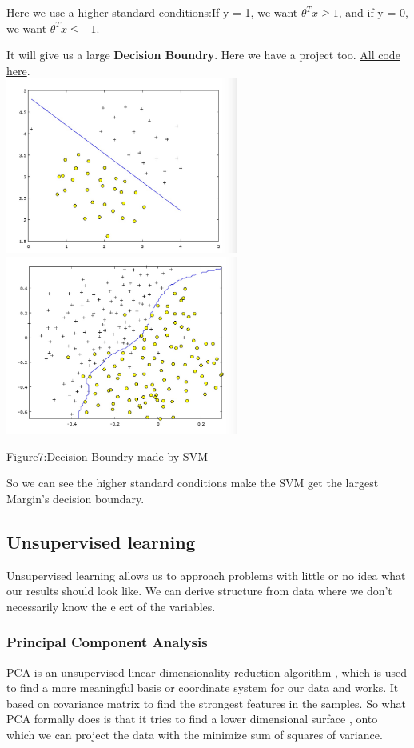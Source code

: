 \documentclass[a4paper]{article}
\begin{document}
{ Here we use a higher standard conditions:If y = 1, we want $ \theta^Tx\ge 1$,
 and if y = 0, we want $\theta^Tx\le -1$. 

 It will give us a large \textbf{Decision Boundry}. Here we have a project too.
\href{https://github.com/GuangYueCHEN/ENSIIE/tree/master/Plus/MachineLearning/machine-learning-ex6}{All code here}.\\
\includegraphics[width=3in]{svm2.png}\includegraphics[width=3in]{svm.png}
\begin{center}
Figure7:Decision Boundry made by SVM
\end{center}
So we can see the higher standard conditions make the SVM get the largest Margin's decision boundary.




\subsection{Unsupervised learning}
Unsupervised learning allows us to approach problems with little or no idea what our results should look like. We can derive structure from data where we don’t necessarily know the e ect of the variables.\\
\subsubsection{\textbf{Principal Component Analysis}}
PCA is an unsupervised linear dimensionality reduction algorithm , which is used to find a more meaningful basis or coordinate system for our data and works. It based on covariance matrix to find the strongest features in the samples. So what PCA formally does is that it tries to find a lower dimensional surface , onto which we can project the data with the minimize sum of squares of variance.

}
\end{document}
